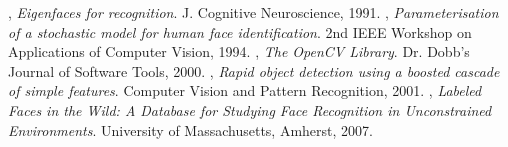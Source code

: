 \documentclass[a4paper,10pt,twocolumn]{extarticle}
\begin{document}
\begin{thebibliography}{9}
  , 
  \emph{Eigenfaces for recognition}.
  J. Cognitive Neuroscience,
  1991. 
  , 
  \emph{Parameterisation of a stochastic model for human face identification}.
  2nd IEEE Workshop on Applications of Computer Vision,
  1994.
  , 
  \emph{The OpenCV Library}.
  Dr. Dobb's Journal of Software Tools,
  2000.
  , 
  \emph{Rapid object detection using a boosted cascade of simple features}.
  Computer Vision and Pattern Recognition,
  2001.
  , 
  \emph{Labeled Faces in the Wild: A Database for Studying Face Recognition in Unconstrained Environments}.
  University of Massachusetts, Amherst,
  2007.

\end{thebibliography}
\end{document}
